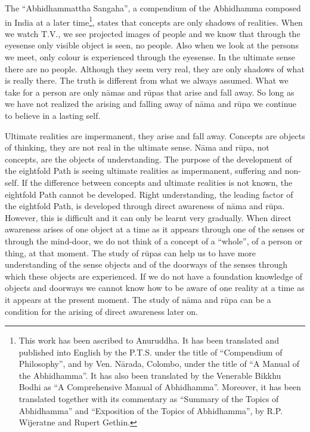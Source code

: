 \documentclass{book}
\begin{document}
The ``Abhidhammattha Sangaha'', a compendium of the Abhidhamma composed
in India at a later time\footnote{This work has
been ascribed to Anuruddha. It has been translated and published into English by the
P.T.S. under the title of ``Compendium of Philosophy'', and by Ven.
N{\=a}rada, Colombo, under the title of ``A Manual of the Abhidhamma''. It
has also been translated by the Venerable Bikkhu Bodhi as ``A
Comprehensive Manual of Abhidhamma''. Moreover, it has been translated
together with its commentary as ``Summary of the Topics of Abhidhamma''
and ``Exposition of the Topics of Abhidhamma'', by R.P. Wijeratne and
Rupert Gethin.}, states that concepts are only shadows of realities.
When we watch T.V., we see projected images of people and we know that
through the eyesense only visible object is seen, no people. Also when
we look at the persons we meet, only colour is experienced through the
eyesense. In the ultimate sense there are no people. Although they seem
very real, they are only shadows of what is really there. The truth is
different from what we always assumed. What we take for a person are
only n{\=a}mas and r\=upas that arise and fall away. So long as we
have not realized the arising and falling away of n{\=a}ma and
r\=upa we continue to believe in a lasting self. 

Ultimate realities are impermanent, they arise and fall away. Concepts
are objects of thinking, they are not real in the ultimate sense.
N{\=a}ma and r\=upa, not concepts, are the objects of understanding.
The purpose of the development of the eightfold Path is seeing ultimate realities as impermanent, suffering and non-self. If the difference between concepts and ultimate realities
is not known, the eightfold Path cannot be developed. Right
understanding, the leading factor of the eightfold Path, is developed
through direct awareness of n{\=a}ma and r\=upa. However, this is
difficult and it can only be learnt very gradually. When direct
awareness arises of one object at a time as it appears through one of
the senses or through the mind-door, we do not think of a concept of
a ``whole'', of a person or thing, at that moment. The study of r\=upas
can help us to have more understanding of the sense objects and of the
doorways of the senses through which these objects are experienced. If
we do not have a foundation knowledge of objects and doorways we cannot
know how to be aware of one reality at a time as it appears at the
present moment. The study of n{\=a}ma and r\=upa can be a condition for
the arising of direct awareness later on. 
\end{document}
